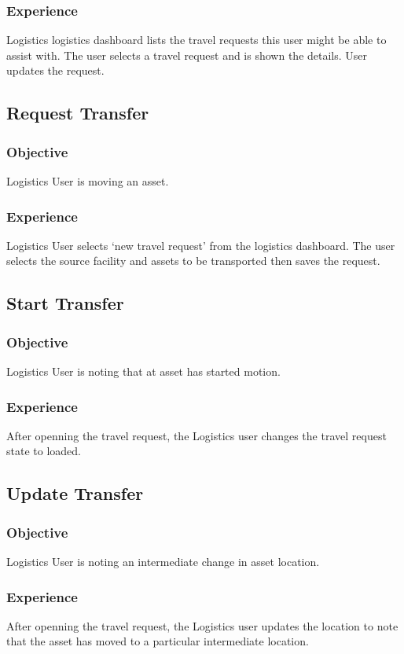 \subsubsection*{Experience}
Logistics logistics dashboard lists the travel requests this user might be able to assist with. The user selects a travel request and is shown the details. User updates the request.

\subsection*{Request Transfer}
\subsubsection*{Objective}
Logistics User is moving an asset.
\subsubsection*{Experience}
Logistics User selects `new travel request' from the logistics dashboard. The user selects the source facility and assets to be transported then saves the request.

\subsection*{Start Transfer}
\subsubsection*{Objective}
Logistics User is noting that at asset has started motion.
\subsubsection*{Experience}
After openning the travel request, the Logistics user changes the travel request state to loaded.

\subsection*{Update Transfer}
\subsubsection*{Objective}
Logistics User is noting an intermediate change in asset location.
\subsubsection*{Experience}
After openning the travel request, the Logistics user updates the location to note that the asset has moved to a particular intermediate location.


